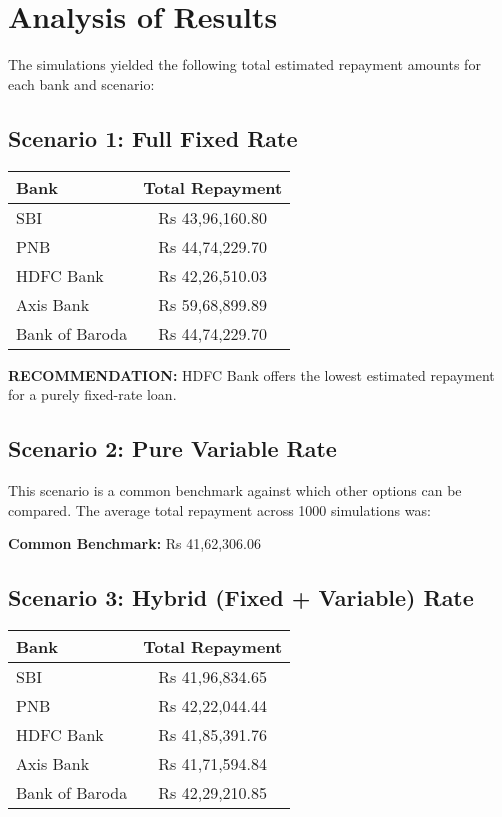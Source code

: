 \documentclass{article}
\begin{document}
\section{Analysis of Results}
The simulations yielded the following total estimated repayment amounts for each bank and scenario:

\subsection{Scenario 1: Full Fixed Rate}
\begin{center}
\begin{tabular}{lc}
\toprule
\textbf{Bank} & \textbf{Total Repayment} \\
\midrule
SBI & Rs 43,96,160.80 \\
PNB & Rs 44,74,229.70 \\
HDFC Bank & Rs 42,26,510.03 \\
Axis Bank & Rs 59,68,899.89 \\
Bank of Baroda & Rs 44,74,229.70 \\
\bottomrule
\end{tabular}
\end{center}

\textbf{RECOMMENDATION:} HDFC Bank offers the lowest estimated repayment for a purely fixed-rate loan.

\subsection{Scenario 2: Pure Variable Rate}
This scenario is a common benchmark against which other options can be compared. The average total repayment across 1000 simulations was:

\textbf{Common Benchmark:} Rs 41,62,306.06

\subsection{Scenario 3: Hybrid (Fixed + Variable) Rate}
\begin{center}
\begin{tabular}{lc}
\toprule
\textbf{Bank} & \textbf{Total Repayment} \\
\midrule
SBI & Rs 41,96,834.65 \\
PNB & Rs 42,22,044.44 \\
HDFC Bank & Rs 41,85,391.76 \\
Axis Bank & Rs 41,71,594.84 \\
Bank of Baroda & Rs 42,29,210.85 \\
\bottomrule
\end{tabular}
\end{center}
\end{document}

